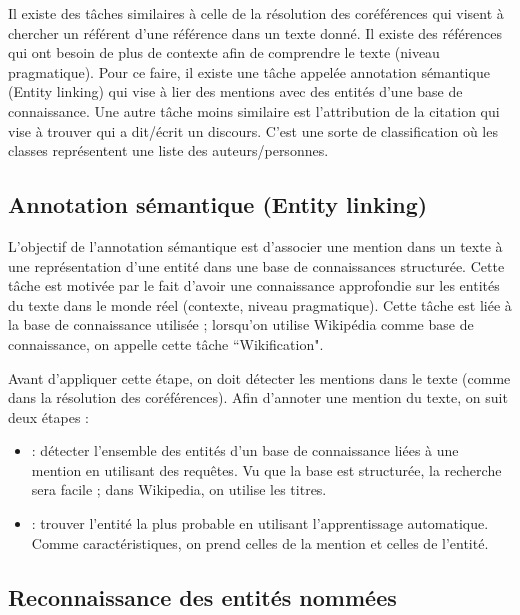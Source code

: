 \documentclass{KodeBook}
\begin{document}
Il existe des tâches similaires à celle de la résolution des coréférences qui visent à chercher un référent d'une référence dans un texte donné. 
Il existe des références qui ont besoin de plus de contexte afin de comprendre le texte (niveau pragmatique). 
Pour ce faire, il existe une tâche appelée annotation sémantique (Entity linking) qui vise à lier des mentions avec des entités d'une base de connaissance. 
Une autre tâche moins similaire est l'attribution de la citation qui vise à trouver qui a dit/écrit un discours. 
C'est une sorte de classification où les classes représentent une liste des auteurs/personnes.


\subsection{Annotation sémantique (Entity linking)}

L'objectif de l'annotation sémantique est d'associer une mention dans un texte à une représentation d'une entité dans une base de connaissances structurée. 
Cette tâche est motivée par le fait d'avoir une connaissance approfondie sur les entités du texte dans le monde réel (contexte, niveau pragmatique).
Cette tâche est liée à la base de connaissance utilisée ; lorsqu'on utilise Wikipédia comme base de connaissance, on appelle cette tâche ``Wikification".

Avant d'appliquer cette étape, on doit détecter les mentions dans le texte (comme dans la résolution des coréférences).
Afin d'annoter une mention du texte, on suit deux étapes :
\begin{itemize}
	\item {} : détecter l'ensemble des entités d'un base de connaissance liées à une mention en utilisant des requêtes.
	Vu que la base est structurée, la recherche sera facile ; dans Wikipedia, on utilise les titres.
	\item {} : trouver l'entité la plus probable en utilisant l'apprentissage automatique. 
	Comme caractéristiques, on prend celles de la mention et celles de l'entité.
\end{itemize}

\subsection{Reconnaissance des entités nommées}
\end{document}
